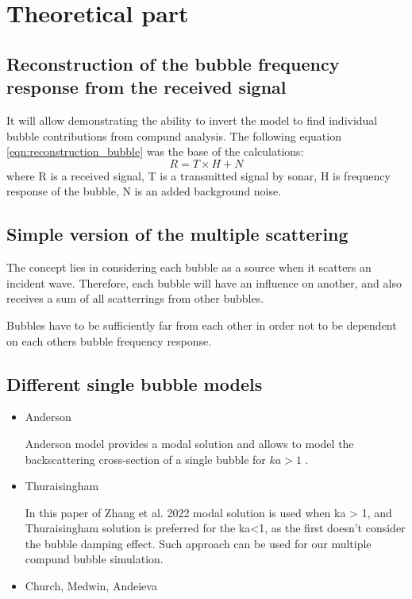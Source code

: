 \documentclass[11pt]{article}
\begin{document}
\section{Theoretical part}

\subsection*{Reconstruction of the bubble frequency response from the received signal}

It will allow demonstrating the ability to invert the model to find individual bubble contributions from compund analysis.
The following equation \ref*{eqn:reconstruction_bubble} was the base of the calculations:
\begin{equation}
    \label{eqn:reconstruction_bubble}
    R = T \times H + N
\end{equation}
where R is a received signal, T is a transmitted signal by sonar, H is frequency response of the bubble, N is an added background noise.


\subsection*{Simple version of the multiple scattering }

The concept lies in considering each bubble as a source when it scatters an incident wave. 
Therefore, each bubble will have an influence on another, and also receives a sum of all scatterrings from 
other bubbles. 

Bubbles have to be sufficiently far from each other in order not to be dependent on each others bubble frequency response.

\subsection*{Different single bubble models}
\begin{itemize}
    \item Anderson

    Anderson model provides a modal solution and allows to model the backscattering cross-section of a single bubble for $ka > 1$ \cite{anderson_sound_2005}.

    \item Thuraisingham

    In this paper of Zhang et al. 2022 \cite{zhang_efficient_2022} modal solution is used when ka > 1, and Thuraisingham solution is preferred for the ka<1, as the first doesn't consider the bubble damping effect.  Such approach can be used for our multiple compund bubble simulation.

    \item Church, Medwin, Andeieva


\end{itemize}
\end{document}
